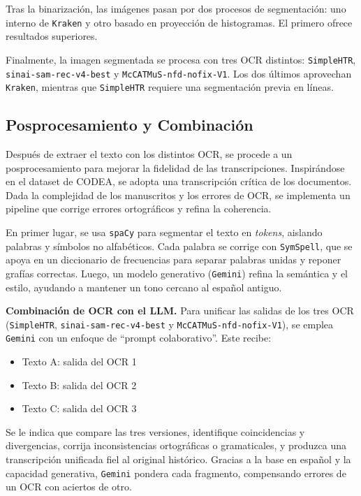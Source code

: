 \documentclass[11pt,a4paper]{article}
\begin{document}
Tras la binarización, las imágenes pasan por dos procesos de segmentación: uno interno de \texttt{Kraken} y otro basado en proyección de histogramas. El primero ofrece resultados superiores. 

Finalmente, la imagen segmentada se procesa con tres OCR distintos: \texttt{SimpleHTR}, \texttt{sinai-sam-rec-v4-best} y \texttt{McCATMuS-nfd-nofix-V1}. Los dos últimos aprovechan \texttt{Kraken}, mientras que \texttt{SimpleHTR} requiere una segmentación previa en líneas.

\subsection{Posprocesamiento y Combinación}

Después de extraer el texto con los distintos OCR, se procede a un posprocesamiento para mejorar la fidelidad de las transcripciones. Inspirándose en el dataset de CODEA, se adopta una transcripción crítica de los documentos. Dada la complejidad de los manuscritos y los errores de OCR, se implementa un pipeline que corrige errores ortográficos y refina la coherencia.

En primer lugar, se usa \texttt{spaCy} para segmentar el texto en \textit{tokens}, aislando palabras y símbolos no alfabéticos. Cada palabra se corrige con \texttt{SymSpell}, que se apoya en un diccionario de frecuencias para separar palabras unidas y reponer grafías correctas. Luego, un modelo generativo (\texttt{Gemini}) refina la semántica y el estilo, ayudando a mantener un tono cercano al español antiguo.

\textbf{Combinación de OCR con el LLM.}  
Para unificar las salidas de los tres OCR (\texttt{SimpleHTR}, \texttt{sinai-sam-rec-v4-best} y \texttt{McCATMuS-nfd-nofix-V1}), se emplea \texttt{Gemini} con un enfoque de “prompt colaborativo”. Este recibe:

\begin{itemize}
\item Texto A: salida del OCR 1  
\item Texto B: salida del OCR 2  
\item Texto C: salida del OCR 3
\end{itemize}

Se le indica que compare las tres versiones, identifique coincidencias y divergencias, corrija inconsistencias ortográficas o gramaticales, y produzca una transcripción unificada fiel al original histórico. Gracias a la base en español y la capacidad generativa, \texttt{Gemini} pondera cada fragmento, compensando errores de un OCR con aciertos de otro.
\end{document}

